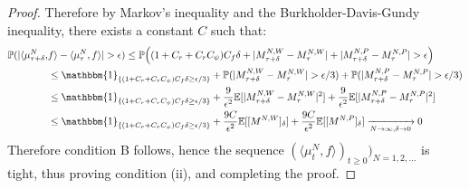 \documentclass{article}
\newcommand{\B}[1]{\mathbb{#1}}
\newcommand{\is}{\mathbbm{1}}
\begin{document}
\begin{proof}
    Therefore by Markov's inequality and the Burkholder-Davis-Gundy inequality, there exists a constant $C$ such that:
    \begin{align*}
        \B{P}(|\langle \mu_{\tau+\delta}^N,&f\rangle-\langle \mu_\tau^N,f\rangle|> \epsilon) \leq \B{P}\Big((1+C_r+C_r C_\psi)C_f\delta+|M_{\tau+\delta}^{N,W}-M_\tau^{N,W}|+|M_{\tau+\delta}^{N,P}-M_{\tau}^{N,P}|>\epsilon\Big)\\
        &\leq \is_{\{(1+C_r+C_rC_\psi)C_f\delta\geq \epsilon/3\}}+\B{P}(|M_{\tau+\delta}^{N,W}-M_\tau^{N,W}|>\epsilon/3)+\B{P}(|M_{\tau+\delta}^{N,P}-M_{\tau}^{N,P}|>\epsilon/3) \\
        &\leq \is_{\{(1+C_r+C_rC_\psi)C_f\delta\geq \epsilon/3\}} + \frac{9}{\epsilon^2}\B{E}[|M_{\tau+\delta}^{N,W}-M_\tau^{N,W}|^2]+\frac{9}{\epsilon^2}\B{E}[|M_{\tau+\delta}^{N,P}-M_\tau^{N,P}|^2]\\
        &\leq \is_{\{(1+C_r+C_rC_\psi)C_f\delta\geq \epsilon/3\}} + \frac{9C}{\epsilon^2}\B{E}[[M^{N,W}]_\delta]+\frac{9C}{\epsilon^2}\B{E}[[M^{N,P}]_\delta]\xrightarrow[N\to\infty,\delta\to 0]{}0\\
    \end{align*}
    Therefore condition B follows, hence the sequence $(\langle \mu_t^N,f\rangle)_{t\geq 0})_{N=1,2,\ldots}$ is tight, thus proving condition (ii), and completing the proof. 
\end{proof}
\end{document}

